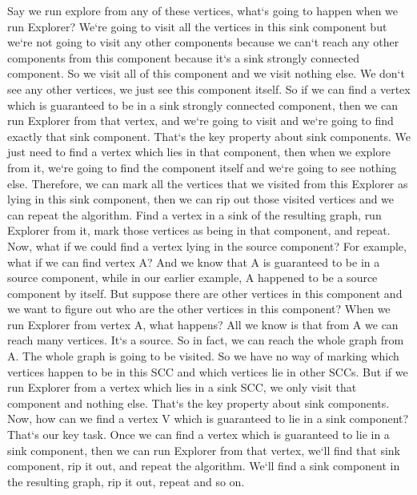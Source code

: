 Say we run explore from any of these vertices, what`s going to happen when we run Explorer? We`re going to visit all the vertices in this sink component but we`re not going to visit any other components because we can`t reach any other components from this component because it`s a sink strongly connected component.
So we visit all of this component and we visit nothing else.
We don`t see any other vertices, we just see this component itself.
So if we can find a vertex which is guaranteed to be in a sink strongly connected component, then we can run Explorer from that vertex, and we`re going to visit and we`re going to find exactly that sink component.
That`s the key property about sink components.
We just need to find a vertex which lies in that component, then when we explore from it, we`re going to find the component itself and we`re going to see nothing else.
Therefore, we can mark all the vertices that we visited from this Explorer as lying in this sink component, then we can rip out those visited vertices and we can repeat the algorithm.
Find a vertex in a sink of the resulting graph, run Explorer from it, mark those vertices as being in that component, and repeat.
Now, what if we could find a vertex lying in the source component? For example, what if we can find vertex A? And we know that A is guaranteed to be in a source component, while in our earlier example, A happened to be a source component by itself.
But suppose there are other vertices in this component and we want to figure out who are the other vertices in this component? When we run Explorer from vertex A, what happens? All we know is that from A we can reach many vertices.
It`s a source.
So in fact, we can reach the whole graph from A\@.
The whole graph is going to be visited.
So we have no way of marking which vertices happen to be in this SCC and which vertices lie in other SCCs.
But if we run Explorer from a vertex which lies in a sink SCC, we only visit that component and nothing else.
That`s the key property about sink components.
Now, how can we find a vertex V which is guaranteed to lie in a sink component? That`s our key task.
Once we can find a vertex which is guaranteed to lie in a sink component, then we can run Explorer from that vertex, we`ll find that sink component, rip it out, and repeat the algorithm.
We`ll find a sink component in the resulting graph, rip it out, repeat and so on.

